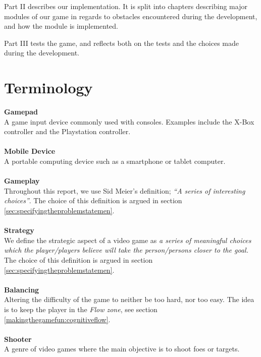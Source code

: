 Part II describes our implementation.
It is split into chapters describing major modules of our game in regards to obstacles encountered during the development, and how the module is implemented.

Part III tests the game, and reflects both on the tests and the choices made during the development.

\section*{Terminology}\label{preface:terminology}
\textbf{Gamepad}\vspace{4pt}\\
A game input device commonly used with consoles.
Examples include the X-Box controller and the Playstation controller.\\
\\
\textbf{Mobile Device}\vspace{4pt}\\
A portable computing device such as a smartphone or tablet computer.\cite{mobileOx}\\
\\
\textbf{Gameplay}\vspace{4pt}\\
Throughout this report, we use Sid Meier's definition; \textit{``A series of interesting choices''}\cite{GDC2012}.
The choice of this definition is argued in section \ref{sec:specifyingtheproblemstatemen}.\\
\\
\textbf{Strategy}\vspace{4pt}\\
We define the strategic aspect of a video game as \emph{a series of meaningful choices which the player/players believe will take the person/persons closer to the goal.}
The choice of this definition is argued in section \ref{sec:specifyingtheproblemstatemen}.\\
\\
\textbf{Balancing}\vspace{4pt}\\
Altering the difficulty of the game to neither be too hard, nor too easy.
The idea is to keep the player in the \textit{Flow zone}, see section \ref{makingthegamefun:cognitiveflow}.\\
\\
\textbf{Shooter}\vspace{4pt}\\
A genre of video games where the main objective is to shoot foes or targets. \cite{oxShooter}\\
